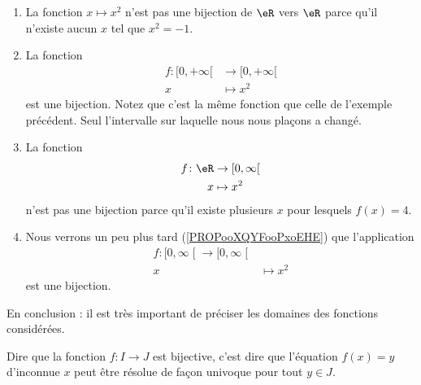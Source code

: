 \begin{example}     \label{EXooCWYHooLEciVj}
    \begin{enumerate}
        \item
            La fonction \( x\mapsto x^2\) n'est pas une bijection de \( \eR\) vers \( \eR\) parce qu'il n'existe aucun \( x\) tel que \( x^2=-1\).
        \item
            La fonction
            \begin{equation}
                \begin{aligned}
                    f\colon \mathopen[ 0 , +\infty [&\to \mathopen[ 0 , +\infty [ \\
                    x&\mapsto x^2
                \end{aligned}
            \end{equation}
            est une bijection. Notez que c'est la même fonction que celle de l'exemple précédent. Seul l'intervalle sur laquelle nous nous plaçons a changé.
        \item
            La fonction
            \begin{equation}
                \begin{aligned}
                    f\colon \eR&\to \mathopen[ 0 , \infty \mathclose[ \\
                    x&\mapsto x^2
                \end{aligned}
            \end{equation}
            n'est pas une bijection parce qu'il existe plusieurs \( x\) pour lesquels \( f(x)=4\).
        \item
            Nous verrons un peu plus tard (\ref{PROPooXQYFooPxoEHE}) que l'application
            \begin{equation}
                \begin{aligned}
                    f\colon \mathopen[ 0 , \infty \mathclose[\to \mathopen[ 0 , \infty \mathclose[\\
                    x&\mapsto x^2
                \end{aligned}
            \end{equation}
            est une bijection.
    \end{enumerate}
    En conclusion : il est très important de préciser les domaines des fonctions considérées.
\end{example}

\begin{remark}
    Dire que la fonction \( f\colon I\to J\) est bijective, c'est dire que l'équation \( f(x)=y\) d'inconnue \( x\) peut être résolue de façon univoque pour tout \( y\in J\).
\end{remark}

